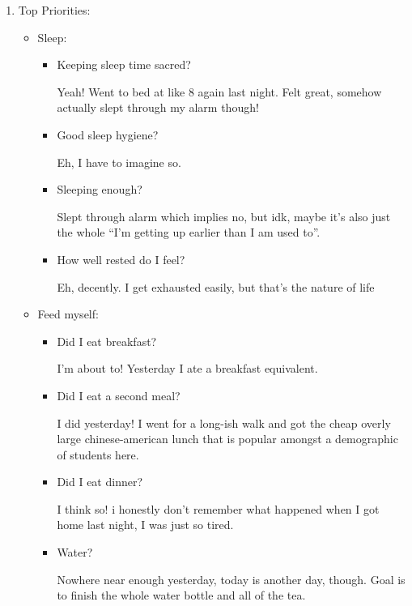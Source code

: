 \documentclass[12pt]{article}
\newcommand{\say}[1]{``#1''}
\renewcommand{\,}{\textsuperscript{,}}
\begin{document}
\begin{enumerate}

\item Top Priorities:

\begin{itemize}

\item Sleep:

\begin{itemize}

\item Keeping sleep time sacred?

Yeah! Went to bed at like 8 again last night. Felt great, somehow actually slept through my alarm though!

\item Good sleep hygiene?

Eh, I have to imagine so.

\item Sleeping enough?

Slept through alarm which implies no, but idk, maybe it's also just the whole \say{I'm getting up earlier than I am used to}.

\item How well rested do I feel?

Eh, decently. I get exhausted easily, but that's the nature of life

\end{itemize}

\item Feed myself:

\begin{itemize}

\item Did I eat breakfast?

I'm about to! Yesterday I ate a breakfast equivalent.

\item Did I eat a second meal?

I did yesterday! I went for a long-ish walk and got the cheap overly large chinese-american lunch that is popular amongst a demographic of students here.

\item Did I eat dinner?

I think so! i honestly don't remember what happened when I got home last night, I was just so tired.

\item Water?

Nowhere near enough yesterday, today is another day, though. Goal is to finish the whole water bottle and all of the tea.


\end{itemize}
\end{itemize}
\end{enumerate}
\end{document}
